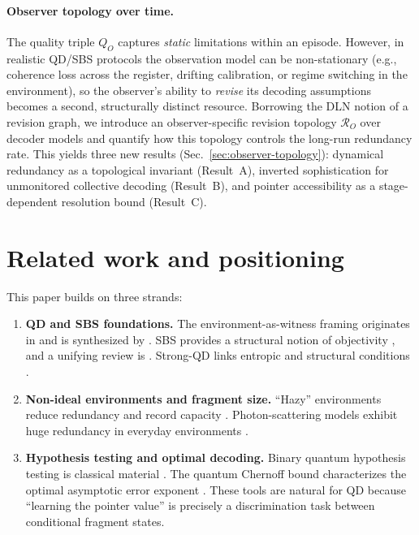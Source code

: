\documentclass[11pt]{article}
\newcommand{\cR}{\mathcal{R}}
\newcommand{\1}{\mathbf{1}}
\theoremstyle{definition}
\theoremstyle{plain}
\begin{document}
\paragraph{Observer topology over time.}
The quality triple $Q_O$ captures \emph{static} limitations within an episode. However, in realistic QD/SBS protocols the observation model can be non-stationary (e.g., coherence loss across the register, drifting calibration, or regime switching in the environment), so the observer's ability to \emph{revise} its decoding assumptions becomes a second, structurally distinct resource. Borrowing the DLN notion of a revision graph, we introduce an observer-specific revision topology $\cR_O$ over decoder models and quantify how this topology controls the long-run redundancy rate. This yields three new results (Sec.~\ref{sec:observer-topology}): dynamical redundancy as a topological invariant (Result~A), inverted sophistication for unmonitored collective decoding (Result~B), and pointer accessibility as a stage-dependent resolution bound (Result~C).

\section{Related work and positioning}

This paper builds on three strands:

\begin{enumerate}[leftmargin=2em]
\item \textbf{QD and SBS foundations.}
The environment-as-witness framing originates in \citet{OPZ2004} and is synthesized by \citet{Zurek2009,BlumeKohoutZurek2006}.
SBS provides a structural notion of objectivity \citep{HorodeckiKorbiczHorodecki2015}, and a unifying review is \citet{KorbiczReview2021}.
Strong-QD links entropic and structural conditions \citep{LeOlayaCastro2019}.
\item \textbf{Non-ideal environments and fragment size.}
``Hazy'' environments reduce redundancy and record capacity \citep{ZwolakQuanZurek2009}.
Photon-scattering models exhibit huge redundancy in everyday environments \citep{RiedelZurek2010,RiedelZurek2011}.
\item \textbf{Hypothesis testing and optimal decoding.}
Binary quantum hypothesis testing is classical material \citep{Helstrom1976,Watrous2018}.
The quantum Chernoff bound characterizes the optimal asymptotic error exponent \citep{Audenaert2007,NussbaumSzkola2009}.
These tools are natural for QD because ``learning the pointer value'' is precisely a discrimination task between conditional fragment states.
\end{enumerate}
\end{document}
